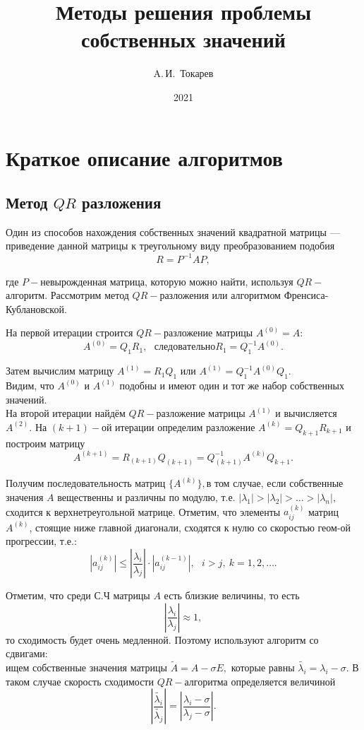 \documentclass[12pt, a4paper]{article}
\title{Методы решения проблемы собственных значений}
\author{A.\,И.~Токарев}
\date{2021}
\begin{document}
    \maketitle
    \tableofcontents 
    \newpage

    \section{Краткое описание алгоритмов}

    \subsection{Метод $QR$ разложения}

    Один из способов нахождения собственных значений квадратной матрицы --- приведение данной матрицы к треугольному виду преобразованием подобия
    \[
        R=P^{-1}AP,
    \]

    \noindent где $P-$невырожденная матрица, которую можно найти, используя $QR-$алгоритм. Рассмотрим метод $QR-$разложения или алгоритмом Френсиса-Кублановской.

    На первой итерации строится $QR-$разложение матрицы $A^{(0)}=A\colon$
    \[
        A^{(0)}=Q_{1}R_{1},~~~ следовательно R_{1}=Q_{1}^{-1}A^{(0)}.
    \]

    Затем вычислим матрицу $A^{(1)}=R_{1}Q_{1}$ или $A^{(1)}=Q_{1}^{-1}A^{(0)}Q_{1}$.\\
    Видим, что $A^{(0)}$ и $A^{(1)}$ подобны и имеют один и тот же набор собственных значений.\\
    На второй итерации найдём $QR-$разложение матрицы $A^{(1)}$ и вычисляется $A^{(2)}.$ На $(k+1)-$ой итерации определим разложение $A^{(k)}=Q_{k+1}R_{k+1}$ и построим матрицу 
    \[
        A^{(k+1)}=R_{(k+1)}Q_{(k+1)}=Q_{(k+1)}^{-1}A^{(k)}Q_{k+1}.
    \]
    
    Получим последовательность матриц $\{A^{(k)}\},$в том случае, если собственные значения $A$ вещественны и различны по модулю, т.е. $|\lambda_{1}|>|\lambda_{2}|>\ldots > |\lambda_{n}|,$ сходится к верхнетреугольной матрице. Отметим, что элементы $a_{ij}^{(k)}$ матриц $A^{(k)}$, стоящие ниже главной диагонали, сходятся к нулю со скоростью геом-ой прогрессии, т.е.:
    \[
        |a_{ij}^{(k)}| \leq |\frac{\lambda_{i}}{\lambda_{j}}| \cdot |a_{ij}^{(k-1)}|,~~~i>j,~k=1,2,\ldots. 
    \]

    Отметим, что среди С.Ч матрицы $A$ есть близкие величины, то есть
    \[
        |\frac{\lambda_{i}}{\lambda_{j}}| \approx 1,
    \]
    то сходимость будет очень медленной. Поэтому используют алгоритм со сдвигами: \\
    ищем собственные значения матрицы $\widetilde{A} = A - \sigma E,$ которые равны $\widetilde{\lambda_{i}} = \lambda_{i} - \sigma.$
    В таком случае скорость сходимости $QR-$алгоритма определяется величиной
    \[
        |\frac{\widetilde{\lambda_{i}}}{\widetilde{\lambda_{j}}}|=|\frac{\lambda_{i}-\sigma}{\lambda_{j}-\sigma}|.
    \]
\end{document}
